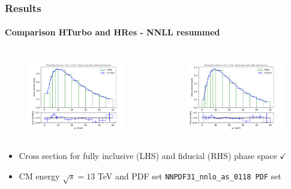 \documentclass[aspectratio=43]{beamer}
\begin{document}
\begin{frame}
	
	\frametitle{Results}
	\framesubtitle{Comparison HTurbo and HRes - NNLL resummed}
	
	\footnotesize
	
	\begin{columns}
	
	
	\begin{figure}
		\includegraphics[width = 7cm]{plots/part3/chapter6/nnlo-res-1.png}
	\end{figure}
	
	
	\begin{figure}
		\includegraphics[width = 7cm]{plots/part3/chapter6/nnlo-res-fid-1.png}
	\end{figure}
	
	\end{columns}
	
	\begin{itemize}
	\item Cross section for fully inclusive (LHS) and fiducial (RHS) phase space {\color{darkgreen}$\checkmark$} 
	\item CM energy $\sqrt s = 13$ TeV and PDF set \texttt{NNPDF31\_nnlo\_as\_0118 PDF} set
	\end{itemize}

\end{frame}
\end{document}
